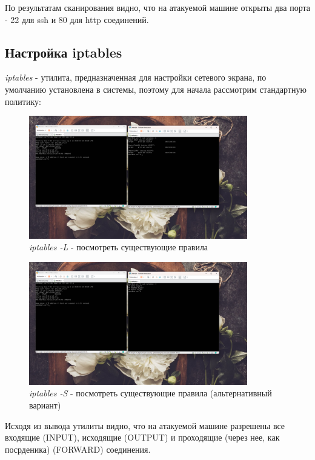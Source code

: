 \documentclass[a4paper]{article}
\begin{document}
  По результатам сканирования видно, что на атакуемой машине открыты два порта - 22 для ssh
  и 80 для http соединений.

  \subsection{Настройка iptables}

  \textit{iptables} - утилита, предназначенная для настройки сетевого экрана, по умолчанию
  установлена в системы, поэтому для начала рассмотрим стандартную политику:

  \begin{figure}[H]
    \centering
    \includegraphics[width=0.85\textwidth]{03_00 (39)}
    \caption{\textit{iptables -L} - посмотреть существующие правила}
    \label{img:39}
  \end{figure}

  \begin{figure}[H]
    \centering
    \includegraphics[width=0.85\textwidth]{03_00 (40)}
    \caption{\textit{iptables -S} - посмотреть существующие правила (альтернативный вариант)}
    \label{img:40}
  \end{figure}

  Исходя из вывода утилиты видно, что на атакуемой машине разрешены все входящие (INPUT), исходящие (OUTPUT)
  и проходящие (через нее, как посрденика) (FORWARD) соединения.
\end{document}
